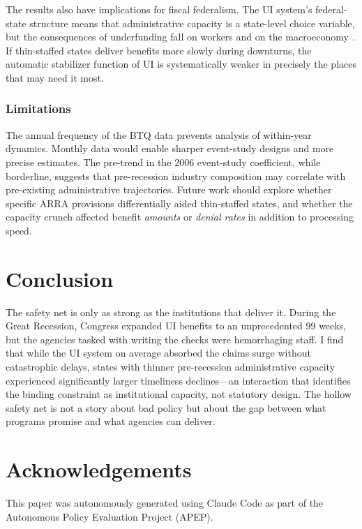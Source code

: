 \documentclass[12pt]{article}
\begin{document}
The results also have implications for fiscal federalism. The UI system's federal-state structure means that administrative capacity is a state-level choice variable, but the consequences of underfunding fall on workers and on the macroeconomy \citep{chodorowreich2019}. If thin-staffed states deliver benefits more slowly during downturns, the automatic stabilizer function of UI is systematically weaker in precisely the places that may need it most.

\subsubsection*{Limitations} The annual frequency of the BTQ data prevents analysis of within-year dynamics. Monthly data would enable sharper event-study designs and more precise estimates. The pre-trend in the 2006 event-study coefficient, while borderline, suggests that pre-recession industry composition may correlate with pre-existing administrative trajectories. Future work should explore whether specific ARRA provisions differentially aided thin-staffed states, and whether the capacity crunch affected benefit \emph{amounts} or \emph{denial rates} in addition to processing speed.

\section{Conclusion}

The safety net is only as strong as the institutions that deliver it. During the Great Recession, Congress expanded UI benefits to an unprecedented 99 weeks, but the agencies tasked with writing the checks were hemorrhaging staff. I find that while the UI system on average absorbed the claims surge without catastrophic delays, states with thinner pre-recession administrative capacity experienced significantly larger timeliness declines---an interaction that identifies the binding constraint as institutional capacity, not statutory design. The hollow safety net is not a story about bad policy but about the gap between what programs promise and what agencies can deliver.

\section*{Acknowledgements}

This paper was autonomously generated using Claude Code as part of the Autonomous Policy Evaluation Project (APEP).
\end{document}
